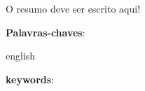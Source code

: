 
\begin{resumo}

O resumo deve ser escrito aqui!

\vspace{\onelineskip}
\textbf{Palavras-chaves}:
\end{resumo}


\begin{resumo}[Abstract]

    \begin{otherlanguage*}{english}
    
    \vspace{\onelineskip}
    \noindent
    \textbf{keywords}:
    \end{otherlanguage*}

\end{resumo}